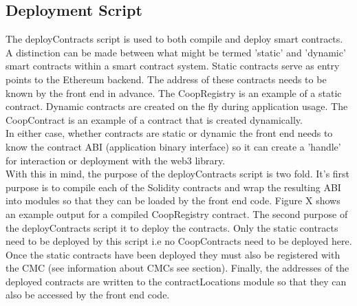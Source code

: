 
\subsection{Deployment Script}
\label{subsec:deployScript}
The deployContracts script is used to both compile and deploy smart contracts. \\

A distinction can be made between what might be termed 'static' and 'dynamic' smart contracts within a smart contract system. Static contracts serve as entry points to the Ethereum backend. The address of these contracts needs to be known by the front end in advance. The CoopRegistry is an example of a static contract. Dynamic contracts are created on the fly during application usage. The CoopContract is an example of a contract that is created dynamically. \\

In either case, whether contracts are static or dynamic the front end needs to know the contract ABI (application binary interface) so it can create a 'handle' for interaction or deployment with the web3 library.\\

With this in mind, the purpose of the deployContracts script is two fold. It's first purpose is to compile each of the Solidity contracts and wrap the resulting ABI into modules so that they can be loaded by the front end code. Figure X shows an example output for a compiled CoopRegistry contract. The second purpose of the deployContracts script it to deploy the contracts. Only the static contracts need to be deployed by this script i.e no CoopContracts need to be deployed here. Once the static contracts have been deployed they must also be registered with the CMC (see information about CMCs see section). Finally, the addresses of the deployed contracts are written to the contractLocations module so that they can also be accessed by the front end code. \\

